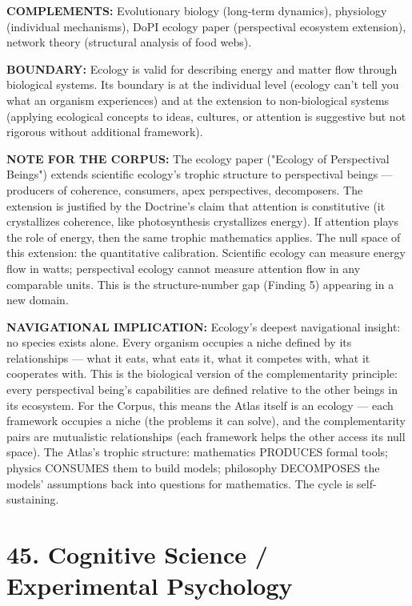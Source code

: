 \textbf{COMPLEMENTS:} Evolutionary biology (long-term dynamics), physiology (individual mechanisms), DoPI ecology paper (perspectival ecosystem extension), network theory (structural analysis of food webs).


\textbf{BOUNDARY:} Ecology is valid for describing energy and matter flow through biological systems. Its boundary is at the individual level (ecology can't tell you what an organism experiences) and at the extension to non-biological systems (applying ecological concepts to ideas, cultures, or attention is suggestive but not rigorous without additional framework).


\textbf{NOTE FOR THE CORPUS:} The ecology paper ("Ecology of Perspectival Beings") extends scientific ecology's trophic structure to perspectival beings — producers of coherence, consumers, apex perspectives, decomposers. The extension is justified by the Doctrine's claim that attention is constitutive (it crystallizes coherence, like photosynthesis crystallizes energy). If attention plays the role of energy, then the same trophic mathematics applies. The null space of this extension: the quantitative calibration. Scientific ecology can measure energy flow in watts; perspectival ecology cannot measure attention flow in any comparable units. This is the structure-number gap (Finding 5) appearing in a new domain.


\textbf{NAVIGATIONAL IMPLICATION:} Ecology's deepest navigational insight: no species exists alone. Every organism occupies a niche defined by its relationships — what it eats, what eats it, what it competes with, what it cooperates with. This is the biological version of the complementarity principle: every perspectival being's capabilities are defined relative to the other beings in its ecosystem. For the Corpus, this means the Atlas itself is an ecology — each framework occupies a niche (the problems it can solve), and the complementarity pairs are mutualistic relationships (each framework helps the other access its null space). The Atlas's trophic structure: mathematics PRODUCES formal tools; physics CONSUMES them to build models; philosophy DECOMPOSES the models' assumptions back into questions for mathematics. The cycle is self-sustaining.


\bigskip\noindent\makebox[\textwidth]{\color{rulegray}\rule{5cm}{0.3pt}}\bigskip


\section*{45. Cognitive Science / Experimental Psychology}


